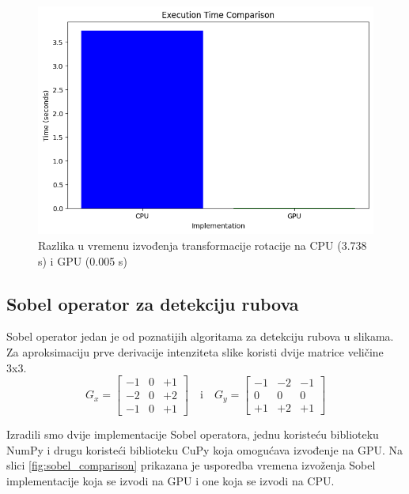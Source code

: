 \documentclass[a4paper,twocolumn]{article}
\begin{document}
        \begin{figure}[H]
		\centering
		\includegraphics[width=0.9\linewidth]{slike/image_tranformatoin_timming_graph.png} 
		\caption{Razlika u vremenu izvođenja transformacije rotacije na CPU (3.738 s) i GPU (0.005 s)}
		\label{fig:tranformatoin_timming}
	\end{figure} 

        \subsection{Sobel operator za detekciju rubova}
        Sobel operator jedan je od poznatijih algoritama za detekciju rubova u slikama. Za aproksimaciju prve derivacije intenziteta slike koristi dvije matrice veličine 3x3.
        \[
        G_x = \begin{bmatrix}
        	-1 & 0 & +1 \\
        	-2 & 0 & +2 \\
        	-1 & 0 & +1 
        \end{bmatrix}
        \quad \text{i} \quad
        G_y = \begin{bmatrix}
        	-1 & -2 & -1 \\
        	0 & 0 & 0 \\
        	+1 & +2 & +1 
        \end{bmatrix}
        \]
        
        Izradili smo dvije implementacije Sobel operatora, jednu koristeću biblioteku NumPy i drugu koristeći biblioteku CuPy koja omogućava izvođenje na GPU.
        Na slici \ref{fig:sobel_comparison} prikazana je usporedba vremena izvoženja Sobel implementacije koja se izvodi na GPU i one koja se izvodi na CPU.
        
\end{document}
